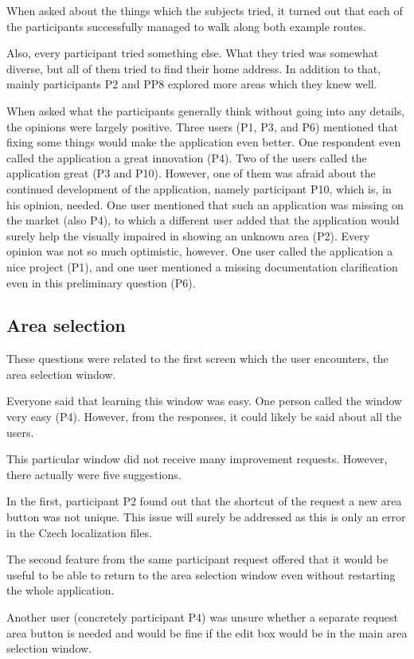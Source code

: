 \documentclass[nolof,digital]{fithesis3}
\begin{document}
When asked about the things which the subjects tried, it turned out that each of the participants successfully managed to walk along both example routes.

Also, every participant tried something else. What they tried was somewhat diverse, but all of them tried to find their home address. In addition to that, mainly participants P2 and PP8 explored more areas which they knew well.

When asked what the participants generally think without going into any details, the opinions were largely positive. Three users (P1, P3, and P6) mentioned that fixing some things would make the application even better. One respondent even called the application a great innovation (P4). Two of the users called the application great (P3 and P10). However, one of them was afraid about the continued development of the application, namely participant P10,  which is, in his opinion, needed. One user mentioned that such an application was missing on the market (also P4), to which a different user added that the application would surely help the visually impaired in showing an unknown area (P2). Every opinion was not so much optimistic, however. One user called the application a nice project (P1), and one user mentioned a missing documentation clarification even in this preliminary question (P6).
\subsection{Area selection}
These questions were related to the first screen which the user encounters, the area selection window.

Everyone said that learning this window was easy. One person called the window very easy (P4). However, from the responses, it could likely be said about all the users.

This particular window did not receive many improvement requests. However, there actually were five suggestions.

In the first, participant P2 found out that the shortcut of the request a new area button was not unique. This issue will surely be addressed as this is only an error in the Czech localization files.

The second feature from the same participant request offered that it would be useful to be able to return to the area selection window even without restarting the whole application.

Another user (concretely participant P4) was unsure whether a separate request area button is needed and would be fine if the edit box would be in the main area selection window.
\end{document}
